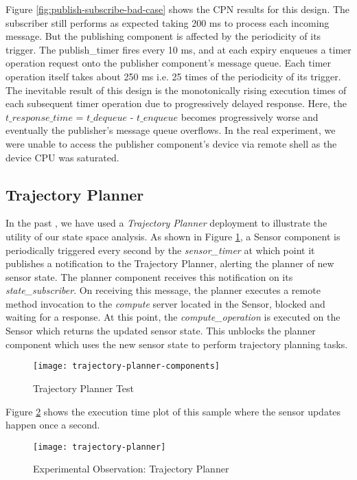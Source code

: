 Figure \ref{fig:publish-subscribe-bad-case} shows the CPN results for this design. The subscriber still performs as expected taking 200 ms to process each incoming message. But the publishing component is affected by the periodicity of its trigger. The publish\_timer fires every 10 ms, and at each expiry enqueues a timer operation request onto the publisher component's message queue. Each timer operation itself takes about 250 ms i.e. 25 times of the periodicity of its trigger. The inevitable result of this design is the monotonically rising execution times of each subsequent timer operation due to progressively delayed response. Here, the $t\_response\_time$ = $t\_dequeue$ - $t\_enqueue$ becomes progressively worse and eventually the publisher's message queue overflows. In the real experiment, we were unable to access the publisher component's device via remote shell as the device CPU was saturated. 

\subsection{Trajectory Planner}

In the past \cite{kumar2014colored}, we have used a \emph{Trajectory Planner} deployment to illustrate the utility of our state space analysis. As shown in Figure \ref{fig:trajectory-planner-components}, a Sensor component is periodically triggered every second by the \emph{sensor\_timer} at which point it publishes a notification to the Trajectory Planner, alerting the planner of new sensor state. The planner component receives this notification on its \emph{state\_subscriber}. On receiving this message, the planner executes a remote method invocation to the \emph{compute} server located in the Sensor, blocked and waiting for a response. At this point, the \emph{compute\_operation} is executed on the Sensor which returns the updated sensor state. This unblocks the planner component which uses the new sensor state to perform trajectory planning tasks. 

\begin{figure}[h]
	\centering
	\texttt{[image: trajectory-planner-components]}
	\caption{Trajectory Planner Test}
	\label{fig:trajectory-planner-components}
\end{figure}
\FloatBarrier

Figure \ref{fig:trajectory-planner} shows the execution time plot of this sample where the sensor updates happen once a second. 

\begin{figure}[h]
	\centering
	\texttt{[image: trajectory-planner]}
	\caption{Experimental Observation: Trajectory Planner}
	\label{fig:trajectory-planner}
\end{figure}
\FloatBarrier

